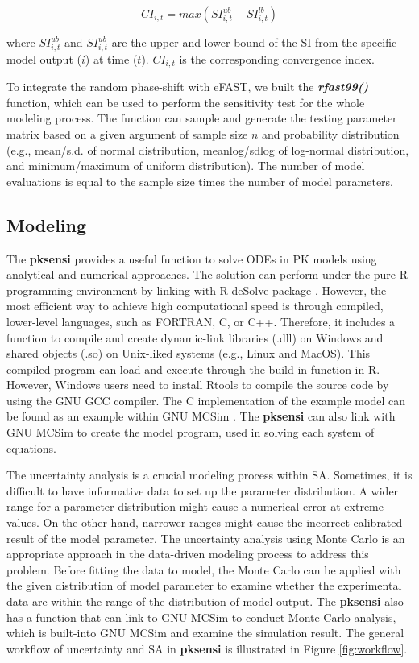 \documentclass[preprint,12pt, a4paper]{elsarticle}
\begin{document}
\[CI_{i,t} = max(SI_{i,t}^{ub}-SI_{i,t}^{lb})\]

where \(SI_{i,t}^{ub}\) and \(SI_{i,t}^{ub}\) are the upper and lower
bound of the SI from the specific model output (\(i\)) at time (\(t\)).
\(CI_{i,t}\) is the corresponding convergence index.

To integrate the random phase-shift with eFAST, we built the
\textbf{\textit{rfast99()}} function, which can be used to perform the sensitivity
test for the whole modeling process. The function can sample and generate the testing parameter matrix
based on a given argument of sample size \(n\) and probability
distribution (e.g., mean/s.d. of normal distribution, meanlog/sdlog of
log-normal distribution, and minimum/maximum of uniform distribution).
The number of model evaluations is equal to the sample size times the
number of model parameters.

\subsection{Modeling}

The \textbf{pksensi} provides a useful function to solve ODEs
in PK models using analytical and numerical approaches. The solution can
perform under the pure R programming environment by linking
with R deSolve package \cite{JSSv033i09}.
However, the most efficient way to achieve high computational speed is
through compiled, lower-level languages, such as FORTRAN, C, or C++. 
Therefore, it includes a function to compile and create
dynamic-link libraries (.dll) on Windows and shared objects (.so) on
Unix-liked systems (e.g., Linux and MacOS). This compiled program can
load and execute through the build-in function in R. However, Windows
users need to install Rtools to compile the source code by using the GNU
GCC compiler. The C implementation of the example model can be found as
an example within GNU MCSim \cite{bois2009gnu}. The \textbf{pksensi}
can also link with GNU MCSim to create the model program, used in
solving each system of equations.

The uncertainty analysis is a crucial modeling process within SA.
Sometimes, it is difficult to have informative data to set up the
parameter distribution. A wider range for a parameter distribution might
cause a numerical error at extreme values. On the other hand, narrower
ranges might cause the incorrect calibrated result of the model
parameter. The uncertainty analysis using Monte Carlo is an appropriate
approach in the data-driven modeling process to address this problem.
Before fitting the data to model, the Monte Carlo can be applied with
the given distribution of model parameter to examine whether the
experimental data are within the range of the distribution of model
output. The \textbf{pksensi} also has a function that can link to GNU MCSim
to conduct Monte Carlo analysis, which is built-into GNU MCSim and
examine the simulation result. The general workflow of uncertainty and
SA in \textbf{pksensi} is illustrated in Figure \ref{fig:workflow}.
\end{document}
